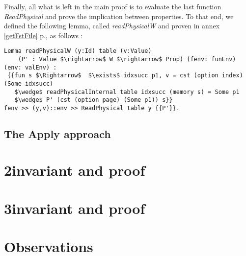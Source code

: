 Finally, all what is left in the main proof is to evaluate the last function \textit{ReadPhysical} and prove the implication between properties. To that end, we defined the following lemma, called \textit{readPhysicalW} and proven in annex \ref{getFstFile} p.\pageref{getFstFile}, as follows : 
\begin{lstlisting}[caption = {readPhysicalW Lemma definition and proof}, xleftmargin=-.08\textwidth,
xrightmargin=-.08\textwidth,mathescape=true]
Lemma readPhysicalW (y:Id) table (v:Value) 
	(P' : Value $\rightarrow$ W $\rightarrow$ Prop) (fenv: funEnv) (env: valEnv) :
 {{fun s $\Rightarrow$  $\exists$ idxsucc p1, v = cst (option index) (Some idxsucc)
   $\wedge$ readPhysicalInternal table idxsucc (memory s) = Some p1 
   $\wedge$ P' (cst (option page) (Some p1)) s}} 
fenv >> (y,v)::env >> ReadPhysical table y {{P'}}.
\end{lstlisting} \vspace{4pt}

\subsection{The Apply approach}

\section{2\nd invariant and proof}

\section{3\rd invariant and proof}

\section{Observations}
